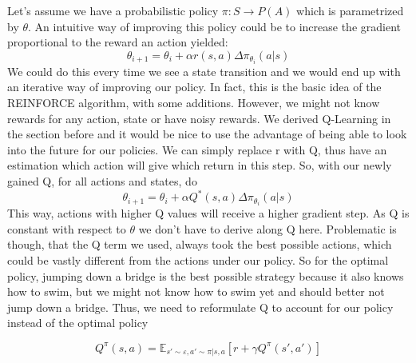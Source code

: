 \documentclass[hyperref,final,beleg]{cgvpub}
\begin{document}
Let's assume we have a probabilistic policy $\pi: S \rightarrow P(A)$ which is parametrized by $\theta$. An intuitive way of improving this policy could be to increase the gradient proportional to the reward an action yielded:
\begin{equation}
\theta_{i+1} = \theta_i + \alpha r(s,a) \Delta \pi_{\theta_i}(a|s)
\label{equ:reinforce}
\end{equation}
We could do this every time we see a state transition and we would end up with an iterative way of improving our policy. In fact, this is the basic idea of the \ac{REINFORCE} algorithm, with some additions. However, we might not know rewards for any action, state or have noisy rewards. We derived Q-Learning in the section before and it would be nice to use the advantage of being able to look into the future for our policies. We can simply replace r with Q, thus have an estimation which action will give which return in this step. So, with our newly gained Q, for all actions and states, do
\begin{equation}
\theta_{i+1} = \theta_i + \alpha Q^*(s, a)\Delta \pi_{\theta_i}(a|s)
\end{equation}
This way, actions with higher Q values will receive a higher gradient step. As Q is constant with respect to $\theta$ we don't have to derive along Q here. Problematic is though, that the Q term we used, always took the best possible actions, which could be vastly different from the actions under our policy. So for the optimal policy, jumping down a bridge is the best possible strategy because it also knows how to swim, but we might not know how to swim yet and should better not jump down a bridge. Thus, we need to reformulate Q to account for our policy instead of the optimal policy

\begin{equation}
Q^{\pi}(s, a) = \mathbb{E}_{s' \sim \varepsilon, a' \sim \pi | s,a}[r + \gamma Q^{\pi}(s', a')]
\end{equation}
\end{document}
